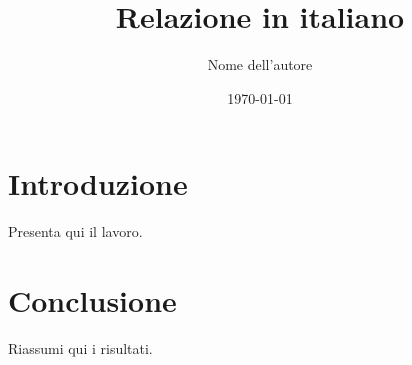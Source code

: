 \documentclass[12pt]{report}
\title{Relazione in italiano}
\author{Nome dell'autore}
\date{\today}
\begin{document}
\maketitle
\tableofcontents

\chapter{Introduzione}
Presenta qui il lavoro.

\chapter{Conclusione}
Riassumi qui i risultati.

% 
\end{document}
